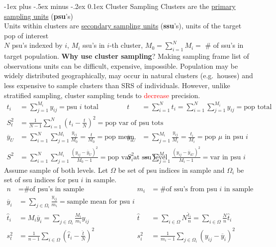 \documentclass[landscape]{article}
\makeatletter
\renewcommand{\section}{\@startsection{section}{1}{0mm}%
                                {-1ex plus -.5ex minus -.2ex}%
                                {0.1ex}%
                                {\color{blue}\normalfont\large\bfseries}}
\makeatother
\begin{document}
\begin{multicols*}{3}
\section{Cluster Sampling}
Clusters are the \underline{primary sampling units} (\textbf{psu}'s)
\\ Units within clusters are \underline{secondary sampling units}
(\textbf{ssu}'s), units of the target pop of interest
\\ $N$ psu's indexed by $i$, $M_i$ ssu's in $i$-th cluster, $M_0 =
\sum_{i=1}^{N} M_i =$ \# of ssu's in target population. \textbf{Why
  use cluster sampling}? Making sampling frame list of observations
units can be difficult, expensive, impossible. Population may be
widely distributed geographically, may occur in natural clusters
(e.g.\ houses) and less expensive to sample clusters than SRS of
individuals. However, unlike stratified sampling, cluster sampling
tends to \textcolor{red}{decrease} precision.
\begin{align*}
  t_i & = \sum_{j = 1}^{M_i} y_{ij} = \text{psu $i$ total}
  & t & = \sum_{i=1}^N t_i = \sum_{i=1}^N \sum_{j=1}^{M_i} y_{ij} =
                              \text{pop total}
  \\ S_t^2 & = \frac{1}{N-1} \sum_{i=1}^N \left(t_i -
             \frac{t}{N}\right)^2 = \text{pop var of psu tots}
  \\ \overline{y}_U & = \sum_{i=1}^N \sum_{j=1}^{M_i}
                      \frac{y_{ij}}{M_0} = \frac{t}{M_0} = \text{pop mean}
  & \overline{y}_{iU} & = \sum_{j=1}^{M_i}\frac{y_{ij}}{M_i} =
                         \frac{t_i}{M_i} = \text{pop $\mu$ in psu $i$}
  \\ S^2 & = \sum_{i=1}^N \sum_{j = 1}^{M_i} \frac{(y_{ij} -
           \overline{y}_U)^2}{M_0 - 1} = \text{pop var at ssu level}
  & S_i^2 & = \sum_{j = 1}^{M_i}
             \frac{(y_{ij}-\overline{y}_{iU})^2}{M_i - 1} =
             \text{var in psu $i$}
\end{align*}
Assume sample of both levels. Let $\Omega$ be set of psu indices in sample
and $\Omega_i$ be set of ssu indices for psu $i$ in sample.
\begin{align*}
  n & = \text{\# of psu's in sample}
  & m_i & = \text{\# of ssu's from psu $i$ in sample}
  \\ \overline{y}_i & = \sum_{j \in \Omega_i} \frac{y_{ij}}{m_i} =
                      \text{sample mean for psu $i$}
  \\ \hat{t}_{i} & = M_i \overline{y}_i = \sum_{j \in \Omega_i} \frac{M_i}{m_i}y_{ij}
  & \hat{t} & = \sum_{i \in \Omega} N \frac{\hat{t}_i}{n} = \sum_{i \in \Omega} \frac{N}{n}\hat{t}_i
  \\ s_t^2 & = \frac{1}{n-1} \sum_{i \in \Omega} \left(\hat{t}_i - \frac{\hat{t}}{N}\right)^2
  & s_i^2 & = \frac{1}{m_i - 1} \sum_{j \in \Omega_i} \left(y_{ij} - \overline{y}_i\right)^2
\end{align*}

\end{multicols*}
\end{document}
